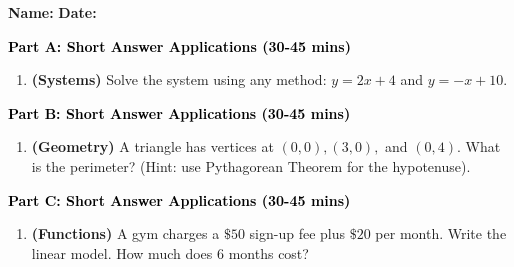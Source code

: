 \documentclass[12pt, letterpaper, fleqn]{article}
\begin{document}
\textbf{Name:} \underline{\hspace{5cm}}
\hfill
\textbf{Date:} \underline{\hspace{3cm}}\\


\begin{tcolorbox}[colback=customteal!20]
\large\textcolor{black}{\textbf{Part A: Short Answer Applications (30-45 mins)}}
\end{tcolorbox}

\vspace{3mm}

\begin{enumerate}[itemsep=4.2cm, leftmargin=0.6cm]
\item \textbf{(Systems)} Solve the system using any method: $y = 2x + 4$ and $y = -x + 10$.
\end{enumerate}

\newpage

\begin{tcolorbox}[colback=customteal!20]
\large\textcolor{black}{\textbf{Part B: Short Answer Applications (30-45 mins)}}
\end{tcolorbox}

\vspace{3mm}

\begin{enumerate}[itemsep=4.2cm, leftmargin=0.6cm, resume]
\item \textbf{(Geometry)} A triangle has vertices at $(0,0), (3,0),$ and $(0,4)$. What is the perimeter? (Hint: use Pythagorean Theorem for the hypotenuse).
\end{enumerate}

\newpage

\begin{tcolorbox}[colback=customteal!20]
\large\textcolor{black}{\textbf{Part C: Short Answer Applications (30-45 mins)}}
\end{tcolorbox}

\vspace{3mm}

\begin{enumerate}[itemsep=4.2cm, leftmargin=0.6cm, resume]
\item \textbf{(Functions)} A gym charges a $\$50$ sign-up fee plus $\$20$ per month. Write the linear model. How much does 6 months cost?
\end{enumerate}

\newpage
\end{document}
